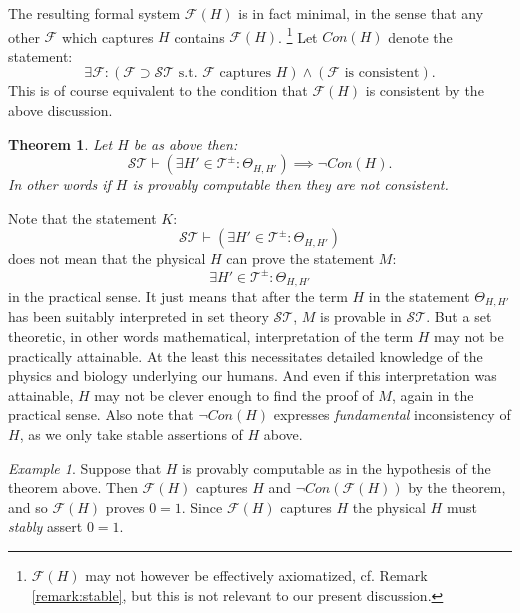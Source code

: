 \documentclass{amsart}  %
\numberwithin{equation}{section}
\newtheorem{theorem}[equation]{Theorem}
\theoremstyle{definition}
\theoremstyle{remark}
\newtheorem{example}{Example}
\begin{document}
{ The resulting formal system $\mathcal{F} (H)$ is in fact minimal, in the sense that any other $\mathcal{F}$ which captures $H$ contains $\mathcal{F} (H)$.
\footnote {$\mathcal{F} (H)$ may not however be effectively axiomatized, cf.
 Remark \ref{remark:stable}, but this is not relevant to our present discussion.} 
Let $Con (H)$ denote the statement:
\begin{equation*}
   \exists \mathcal{F}: (\mathcal{F} \supset \mathcal{ST} \text{ s.t. $\mathcal{F}$ captures $H$}) \land  (\text {$\mathcal{F}$ is consistent}).
\end{equation*}
This is of course equivalent to the condition that $\mathcal{F} (H)$ is consistent by the above discussion.
\begin{theorem} \label{thm:negCon} Let $H $ be as above then:
\begin{equation*}
 \mathcal{ST} \vdash (\exists H' \in \mathcal{T} ^{\pm}: 
 \Theta _{H, H'})  \implies \neg Con (H).
\end{equation*} 
In other words if $H$ is provably computable then they are not consistent. 
\end{theorem}
 Note that the statement $K$: $$\mathcal{ST} \vdash (\exists H' \in \mathcal{T} ^{\pm}: 
 \Theta _{H, H'})$$ does not mean that the physical $H $ can prove the statement $M$:
\begin{equation} \label{eq:M}
\exists H' \in \mathcal{T} ^{\pm}: 
 \Theta _{H, H'}
\end{equation}
  in the practical sense. It just means that after the term $H$ in the statement $\Theta _{H, H' } $ has been suitably interpreted in set theory $\mathcal{ST}$, $M$ is provable in $\mathcal{ST}$.  But a set theoretic, in other words mathematical, interpretation of the term $H$ may not be practically attainable. At the least this necessitates detailed knowledge of the physics and biology underlying our humans. And even if this interpretation was attainable, $H$ may not be clever enough to find the proof of $M$, again in the practical sense. Also note that $\neg Con (H)$ expresses \emph{fundamental} inconsistency of $H$, as we only take stable assertions of $H$ above.  
 \begin{example} \label{example:0=1} Suppose that $H$ is provably computable as in the hypothesis of the theorem above. Then $\mathcal{F} (H)$ captures $H$ and $\neg Con (\mathcal{F} (H))$ by the theorem, and so $\mathcal{F} (H)$ proves $0=1$. Since $\mathcal{F} (H)$  captures $H$ the physical $H$ must \emph{stably} assert $0=1$.

\end{example}}
\end{document}
